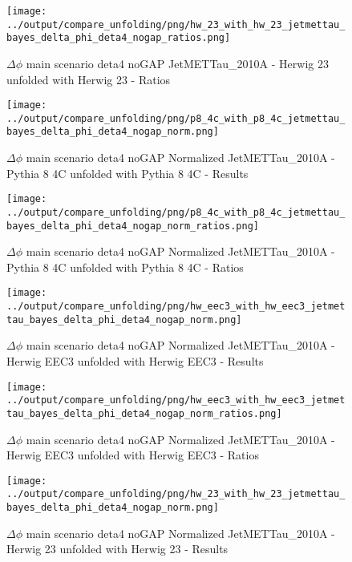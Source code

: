 \documentclass[11pt]{book}
\begin{document}
\begin{figure}[ht]
\centering
\texttt{[image: ../output/compare\_unfolding/png/hw\_23\_with\_hw\_23\_jetmettau\_bayes\_delta\_phi\_deta4\_nogap\_ratios.png]}
\caption{$\Delta\phi$ main scenario deta4 noGAP JetMETTau\_2010A - Herwig 23 unfolded with Herwig 23 - Ratios}
\label{hw_23_hw_23_jetmettau_bayes_delta_phi_deta4_nogap_b}
\end{figure}


\begin{figure}[ht]
\centering
\texttt{[image: ../output/compare\_unfolding/png/p8\_4c\_with\_p8\_4c\_jetmettau\_bayes\_delta\_phi\_deta4\_nogap\_norm.png]}
\caption{$\Delta\phi$ main scenario deta4 noGAP Normalized JetMETTau\_2010A - Pythia 8 4C unfolded with Pythia 8 4C - Results}
\label{p8_p8_jetmettau_bayes_delta_phi_deta4_nogap_norm_a}
\end{figure}

\begin{figure}[ht]
\centering
\texttt{[image: ../output/compare\_unfolding/png/p8\_4c\_with\_p8\_4c\_jetmettau\_bayes\_delta\_phi\_deta4\_nogap\_norm\_ratios.png]}
\caption{$\Delta\phi$ main scenario deta4 noGAP Normalized JetMETTau\_2010A - Pythia 8 4C unfolded with Pythia 8 4C - Ratios}
\label{p8_p8_jetmettau_bayes_delta_phi_deta4_nogap_norm_b}
\end{figure}

\begin{figure}[ht]
\centering
\texttt{[image: ../output/compare\_unfolding/png/hw\_eec3\_with\_hw\_eec3\_jetmettau\_bayes\_delta\_phi\_deta4\_nogap\_norm.png]}
\caption{$\Delta\phi$ main scenario deta4 noGAP Normalized JetMETTau\_2010A - Herwig EEC3 unfolded with Herwig EEC3 - Results}
\label{hw_eec3_hw_eec3_jetmettau_bayes_delta_phi_deta4_nogap_norm_a}
\end{figure}

\begin{figure}[ht]
\centering
\texttt{[image: ../output/compare\_unfolding/png/hw\_eec3\_with\_hw\_eec3\_jetmettau\_bayes\_delta\_phi\_deta4\_nogap\_norm\_ratios.png]}
\caption{$\Delta\phi$ main scenario deta4 noGAP Normalized JetMETTau\_2010A - Herwig EEC3 unfolded with Herwig EEC3 - Ratios}
\label{hw_eec3_hw_eec3_jetmettau_bayes_delta_phi_deta4_nogap_norm_b}
\end{figure}

\begin{figure}[ht]
\centering
\texttt{[image: ../output/compare\_unfolding/png/hw\_23\_with\_hw\_23\_jetmettau\_bayes\_delta\_phi\_deta4\_nogap\_norm.png]}
\caption{$\Delta\phi$ main scenario deta4 noGAP Normalized JetMETTau\_2010A - Herwig 23 unfolded with Herwig 23 - Results}
\label{hw_23_hw_23_jetmettau_bayes_delta_phi_deta4_nogap_norm_a}
\end{figure}
\end{document}
